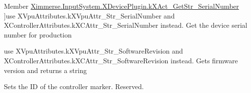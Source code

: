 \begin{DoxyRefList}
%
Member \mbox{\hyperlink{class_ximmerse_1_1_input_system_1_1_x_device_plugin_ab7f817a86e5b3af956089fb089b7d0c3ab8d69f4b069e98e7d7013fa609d3e9f6}{Ximmerse.Input\+System.X\+Device\+Plugin.k\+X\+Act\+\_\+\+Get\+Str\+\_\+\+Serial\+Number}} ]use X\+Vpu\+Attributes.\+k\+X\+Vpu\+Attr\+\_\+\+Str\+\_\+\+Serial\+Number and X\+Controller\+Attributes.\+k\+X\+C\+Attr\+\_\+\+Str\+\_\+\+Serial\+Number instead. Get the device serial number for production  
\item[\label{deprecated__deprecated000016}%
\Hypertarget{deprecated__deprecated000016}%
Member \mbox{\hyperlink{class_ximmerse_1_1_input_system_1_1_x_device_plugin_ab7f817a86e5b3af956089fb089b7d0c3a6f905100ff14cfe78e99cd6941b16943}{Ximmerse.Input\+System.X\+Device\+Plugin.k\+X\+Act\+\_\+\+Get\+Str\+\_\+\+Software\+Revision}} ]use X\+Vpu\+Attributes.\+k\+X\+Vpu\+Attr\+\_\+\+Str\+\_\+\+Software\+Revision and X\+Controller\+Attributes.\+k\+X\+C\+Attr\+\_\+\+Str\+\_\+\+Software\+Revision instead. Gets firmware version and returns a string  
\item[\label{deprecated__deprecated000011}%
\Hypertarget{deprecated__deprecated000011}%
Member \mbox{\hyperlink{class_ximmerse_1_1_input_system_1_1_x_device_plugin_ab7f817a86e5b3af956089fb089b7d0c3a90775e3138598cd014cad7d925d1545a}{Ximmerse.Input\+System.X\+Device\+Plugin.k\+X\+Act\+\_\+\+Set\+Blog\+ID}} ]Sets the ID of the controller marker. Reserved. 
\end{DoxyRefList}
